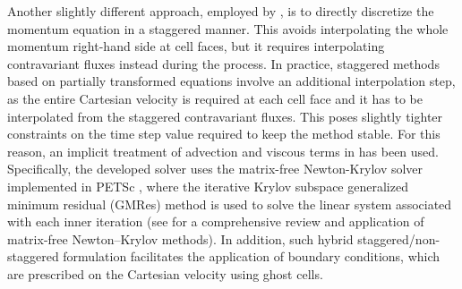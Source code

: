 Another slightly different approach, employed by \cite{RosenfeldEtAl1992}, is to directly discretize the momentum equation in a staggered manner. This avoids interpolating the whole momentum right-hand side at cell faces, but it requires interpolating contravariant fluxes instead during the process. In practice, staggered methods based on partially transformed equations involve an additional interpolation step, as the entire Cartesian velocity is required at each cell face and it has to be interpolated from the staggered contravariant fluxes. This poses slightly tighter constraints on the time step value required to keep the method stable. For this reason, an implicit treatment of advection and viscous terms in  has been used. Specifically, the developed solver uses the matrix-free Newton-Krylov solver implemented in \acrshort{PETSc} \citep{BalayEtAl2022b}, where the iterative Krylov subspace generalized minimum residual (\acrshort{GMRes}) method \citep{SaadSchultz1986} is used to solve the linear system associated with each inner iteration (see \citealp{KnollKeyes2004} for a comprehensive review and application of matrix-free Newton–Krylov methods). In addition, such hybrid staggered/non-staggered formulation facilitates the application of boundary conditions, which are prescribed on the Cartesian velocity using ghost cells. 

